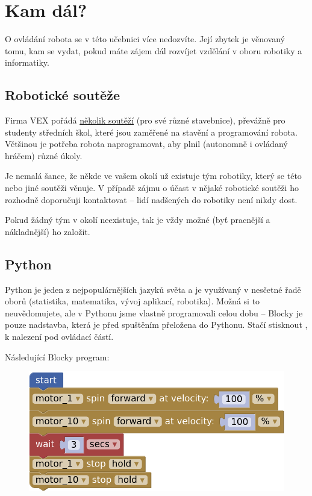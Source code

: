 \documentclass[../main.tex]{subfiles}
\begin{document}
	\section{Kam dál?}
	O ovládání robota se v této učebnici více nedozvíte. Její zbytek je věnovaný tomu, kam se vydat, pokud máte zájem dál rozvíjet vzdělání v oboru robotiky a informatiky.

	\subsection{Robotické soutěže}
	Firma VEX pořádá \href{https://www.vexrobotics.com/competition?___store=vexroboticseu&___from_store=vexrobotics}{několik soutěží} (pro své různé stavebnice), převážně pro studenty středních škol, které jsou zaměřené na stavění a programování robota. Většinou je potřeba robota naprogramovat, aby plnil (autonomně i ovládaný hráčem) různé úkoly.

	Je nemalá šance, že někde ve vašem okolí už existuje tým robotiky, který se této nebo jiné soutěži věnuje. V případě zájmu o účast v nějaké robotické soutěži ho rozhodně doporučuji kontaktovat -- lidí nadšených do robotiky není nikdy dost.

	Pokud žádný tým v okolí neexistuje, tak je vždy možné (byť pracnější a nákladnější) ho založit. 

	\subsection{Python}
	Python je jeden z nejpopulárnějších jazyků světa a je využívaný v nesčetné řadě oborů (statistika, matematika, vývoj aplikací, robotika). Možná si to neuvědomujete, ale v Pythonu jsme vlastně programovali celou dobu -- Blocky je pouze nadstavba, která je před spuštěním přeložena do Pythonu. Stačí stisknout , k nalezení pod ovládací částí.

	Následující Blocky program:

	\begin{figure}[h!]
		\centering
		\begin{minipage}{0.50\textwidth}
			\includegraphics[width=\linewidth]{Images/06/program.png}
		\end{minipage}
	\end{figure}
\end{document}
